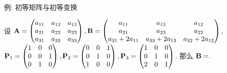 \begin{frame}{例: 初等矩阵与初等变换}
	\onslide<+->
	\begin{example}
		设 ${\mathbf{A}}=\begin{pmatrix}
			a_{11}&a_{12}&a_{13}\\
			a_{21}&a_{22}&a_{23}\\
			a_{31}&a_{32}&a_{33}
		\end{pmatrix},{\mathbf{B}}=\begin{pmatrix}
			a_{11}&a_{13}&a_{12}\\
			a_{21}&a_{23}&a_{22}\\
			a_{31}+2a_{11}&a_{33}+2a_{13}&a_{32}+2a_{12}
		\end{pmatrix}$,\\
		${\mathbf{P}}_1=\begin{pmatrix}
			1&0&0\\0&0&1\\0&1&0
		\end{pmatrix},{\mathbf{P}}_2=\begin{pmatrix}
			0&0&1\\0&1&0\\1&0&0
		\end{pmatrix},{\mathbf{P}}_3=\begin{pmatrix}
			1&0&0\\0&1&0\\2&0&1
		\end{pmatrix}$.
		那么 ${\mathbf{B}}=$.
	\end{example}
\end{frame}



